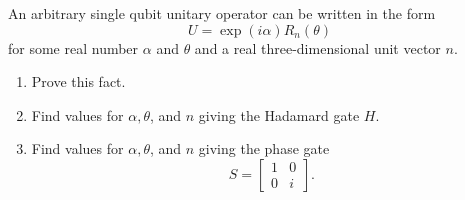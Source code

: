 \documentclass{article}
\begin{document}
\begin{exercise}
  An arbitrary single qubit unitary operator can be written in the form
  \[U=\exp(i\alpha)R_n(\theta)\]
  for some real number $\alpha$ and $\theta$ and a real three-dimensional unit vector $n$.
  \begin{enumerate}
    \item Prove this fact.
    \item Find values for $\alpha,\theta$, and $n$ giving the Hadamard gate $H$.
    \item Find values for $\alpha,\theta$, and $n$ giving the phase gate
    \[S=\begin{bmatrix}
      1&0\\
      0&i
    \end{bmatrix}.\]
  \end{enumerate}
\end{exercise}

\begin{theorem}

\end{theorem}
\end{document}
